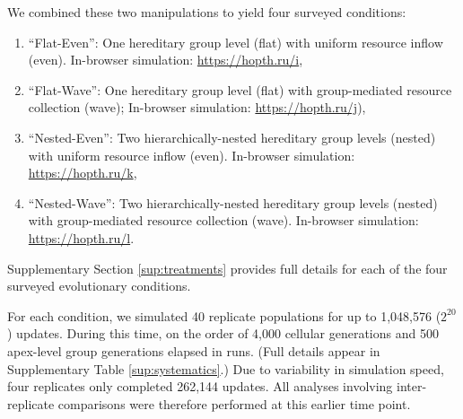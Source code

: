 We combined these two manipulations to yield four surveyed conditions:
\begin{enumerate}
\item ``Flat-Even'': One hereditary group level (flat) with uniform resource inflow (even). In-browser simulation: \url{https://hopth.ru/i},
\item ``Flat-Wave'': One  hereditary group level (flat) with group-mediated resource collection (wave); In-browser simulation: \url{https://hopth.ru/j}),
\item ``Nested-Even'': Two hierarchically-nested hereditary group levels (nested) with uniform resource inflow (even). In-browser simulation: \url{https://hopth.ru/k},
\item ``Nested-Wave'': Two hierarchically-nested hereditary group levels (nested) with group-mediated resource collection (wave). In-browser simulation: \url{https://hopth.ru/l}.
\end{enumerate}

Supplementary Section \ref{sup:treatments} provides full details for each of the four surveyed evolutionary conditions.

For each condition, we simulated 40 replicate populations for up to
1,048,576 ($2^{20}$) updates.
During this time, on the order of 4,000 cellular generations and 500 apex-level group generations elapsed in runs.
(Full details appear in Supplementary Table \ref{sup:systematics}.)
Due to variability in simulation speed, four replicates only completed 262,144 updates.
All analyses involving inter-replicate comparisons were therefore performed at this earlier time point.
